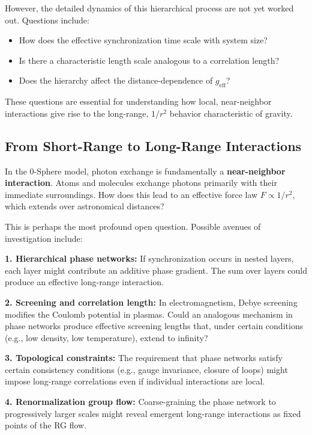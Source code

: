 \documentclass[12pt,letterpaper]{article}
\begin{document}
However, the detailed dynamics of this hierarchical process are not yet worked out. Questions include:
\begin{itemize}
\item How does the effective synchronization time scale with system size?
\item Is there a characteristic length scale analogous to a correlation length?
\item Does the hierarchy affect the distance-dependence of $g_\text{eff}$?
\end{itemize}

These questions are essential for understanding how local, near-neighbor interactions give rise to the long-range, $1/r^2$ behavior characteristic of gravity.


\subsection{From Short-Range to Long-Range Interactions}
\label{subsec:long_range}

In the 0-Sphere model, photon exchange is fundamentally a \textbf{near-neighbor interaction}. Atoms and molecules exchange photons primarily with their immediate surroundings. How does this lead to an effective force law $F \propto 1/r^2$, which extends over astronomical distances?

This is perhaps the most profound open question. Possible avenues of investigation include:

\textbf{1. Hierarchical phase networks:} If synchronization occurs in nested layers, each layer might contribute an additive phase gradient. The sum over layers could produce an effective long-range interaction.

\textbf{2. Screening and correlation length:} In electromagnetism, Debye screening modifies the Coulomb potential in plasmas. Could an analogous mechanism in phase networks produce effective screening lengths that, under certain conditions (e.g., low density, low temperature), extend to infinity?

\textbf{3. Topological constraints:} The requirement that phase networks satisfy certain consistency conditions (e.g., gauge invariance, closure of loops) might impose long-range correlations even if individual interactions are local.

\textbf{4. Renormalization group flow:} Coarse-graining the phase network to progressively larger scales might reveal emergent long-range interactions as fixed points of the RG flow.
\end{document}
